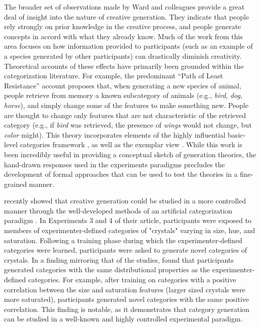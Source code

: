 \documentclass[12pt]{article}
\begin{document}
\begin{flushleft}
The broader set of observations made by Ward and colleagues provide a great deal of insight into the nature of creative generation. They indicate that people rely strongly on prior knowledge in the creative process, and people generate concepts in accord with what they already know. Much of the work from this area \citep[e.g.,][]{smith1993constraining,marsh1999inadvertent} focuses on how information provided to participants (such as an example of a species generated by other participants) can drastically diminish creativity. Theoretical accounts of these effects have primarily been grounded within the categorization literature. For example, the predominant ``Path of Least Resistance'' account \citep[see][]{ward1994structured,ward1995s,ward2002role} proposes that, when generating a new species of animal, people retrieve from memory a known subcategory of animals (e.g., {\em bird}, {\em dog}, {\em horse}), and simply change some of the features to make something new. People are thought to change only features that are not characteristic of the retrieved category (e.g., if {\em bird} was retrieved, the presence of {\em wings} would not change, but {\em color} might). This theory incorporates elements of the highly influential basic-level categories framework \citep{rosch1975cognitive,rosch1976basic}, as well as the exemplar view \citep{medin1978context,brooks1978nonanalytic}. While this work is been incredibly useful in providing a conceptual sketch of generation theories, the hand-drawn responses used in the experiments paradigms precludes the development of formal approaches that can be used to test the theories in a fine-grained manner.

\cite{jern2013probabilistic} recently showed that creative generation could be studied in a more controlled manner through the well-developed methods of an artificial categorization paradigm \citep[see][for a review]{kurtz2015human}. In Experiments 3 and 4 of their article, participants were exposed to members of experimenter-defined categories of "crystals" varying in size, hue, and saturation. Following a training phase during which the experimenter-defined categories were learned, participants were asked to generate novel categories of crystals. In a finding mirroring that of the \cite{ward1994structured} studies, \cite{jern2013probabilistic} found that participants generated categories with the same distributional properties as the experimenter-defined categories. For example, after training on categories with a positive correlation between the size and saturation features (larger sized crystals were more saturated), participants generated novel categories with the same positive correlation. This finding is notable, as it demonstrates that category generation can be studied in a well-known and highly controlled experimental paradigm. 


\end{flushleft}
\end{document}
